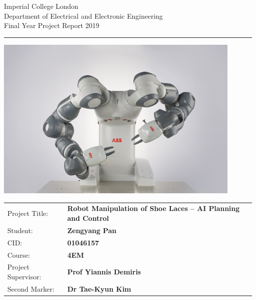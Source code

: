 \begin{titlepage}
    \setlength{\parindent}{0pt}
    \setlength{\parskip}{0pt}
    
    {
                    \Large
                    \raggedright
                    Imperial College London\\[17pt]
                    Department of Electrical and Electronic Engineering\\[17pt]
                    Final Year Project Report 2019\\[17pt]
    
    }
    
    \rule{\columnwidth}{3pt}
    \vfill
    \centering
      \includegraphics[width=\columnwidth,height=80mm,keepaspectratio]{title/YuMicover.jpeg}
    \vfill
    \setlength{\tabcolsep}{0pt}
    
    \begin{tabular}{p{40mm}p{\dimexpr\columnwidth-40mm}}
                    Project Title: & \textbf{Robot Manipulation of Shoe Laces -- AI Planning and Control} \\[12pt]
                    Student: & \textbf{Zengyang Pan} \\[12pt]
                    CID: & \textbf{01046157} \\[12pt]
                    Course: & \textbf{4EM} \\[12pt]
                    Project Supervisor: & \textbf{Prof Yiannis Demiris} \\[12pt]
                    Second Marker: & \textbf{Dr Tae-Kyun Kim} \\
    \end{tabular}
\end{titlepage}
